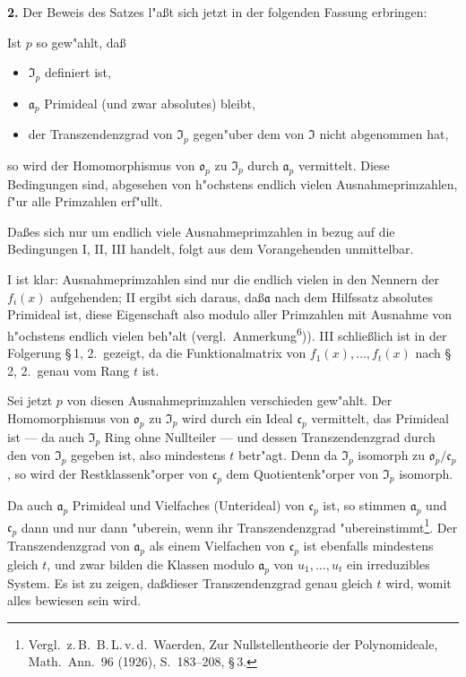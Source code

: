 \documentclass[12pt,a4paper]{article}
\theoremstyle{plain}
\begin{document}
\medskip\noindent\textbf{2.}
Der Beweis des Satzes l"a\ss t sich jetzt in der folgenden Fassung erbringen:

Ist $p$ so gew"ahlt, da\ss
\begin{itemize}
\item[I.] $\mathfrak{I}_p$ definiert ist,
\item[II.] $\mathfrak{a}_p$ Primideal (und zwar absolutes) bleibt,
\item[III.] der Transzendenzgrad von $\mathfrak{I}_p$ gegen"uber dem von $\mathfrak{I}$ nicht abgenommen hat,
\end{itemize}
so wird der Homomorphismus von $\mathfrak{o}_p$ zu $\mathfrak{I}_p$ durch $\mathfrak{a}_p$ vermittelt. Diese Bedingungen sind, abgesehen von h"ochstens endlich vielen Ausnahmeprimzahlen, f"ur alle Primzahlen erf"ullt.

Da\ss es sich nur um endlich viele Ausnahmeprimzahlen in bezug auf die Bedingungen I, II, III handelt, folgt aus dem Vorangehenden unmittelbar.

I ist klar: Ausnahmeprimzahlen sind nur die endlich vielen in den Nennern der $f_i(x)$ aufgehenden; II ergibt sich daraus, da\ss $\mathfrak{a}$ nach dem Hilfssatz absolutes Primideal ist, diese Eigenschaft also modulo aller Primzahlen mit Ausnahme von h"ochstens endlich vielen beh"alt (vergl.\ Anmerkung\textsuperscript{6})). III schlie\ss lich ist in der Folgerung \S\,1, 2.\ gezeigt, da die Funktionalmatrix von $f_1(x),\ldots,f_t(x)$ nach \S\,2, 2.\ genau vom Rang $t$ ist.

Sei jetzt $p$ von diesen Ausnahmeprimzahlen verschieden gew"ahlt. Der Homomorphismus von $\mathfrak{o}_p$ zu $\mathfrak{I}_p$ wird durch ein Ideal $\mathfrak{c}_p$ vermittelt, das Primideal ist --- da auch $\mathfrak{I}_p$ Ring ohne Nullteiler --- und dessen Transzendenzgrad durch den von $\mathfrak{I}_p$ gegeben ist, also mindestens $t$ betr"agt. Denn da $\mathfrak{I}_p$ isomorph zu $\mathfrak{o}_p/\mathfrak{c}_p$, so wird der Restklassenk"orper von $\mathfrak{c}_p$ dem Quotientenk"orper von $\mathfrak{I}_p$ isomorph.

Da auch $\mathfrak{a}_p$ Primideal und Vielfaches (Unterideal) von $\mathfrak{c}_p$ ist, so stimmen $\mathfrak{a}_p$ und $\mathfrak{c}_p$ dann und nur dann "uberein, wenn ihr Transzendenzgrad "ubereinstimmt\footnote{Vergl.\ z.\,B.\ B.\,L.\,v.\,d.\ Waerden, Zur Nullstellentheorie der Polynomideale, Math.\ Ann.\ 96 (1926), S.\ 183--208, \S\,3.}. Der Transzendenzgrad von $\mathfrak{a}_p$ als einem Vielfachen von $\mathfrak{c}_p$ ist ebenfalls mindestens gleich $t$, und zwar bilden die Klassen modulo $\mathfrak{a}_p$ von $u_1,\ldots,u_t$ ein irreduzibles System. Es ist zu zeigen, da\ss dieser Transzendenzgrad genau gleich $t$ wird, womit alles bewiesen sein wird.
\end{document}
